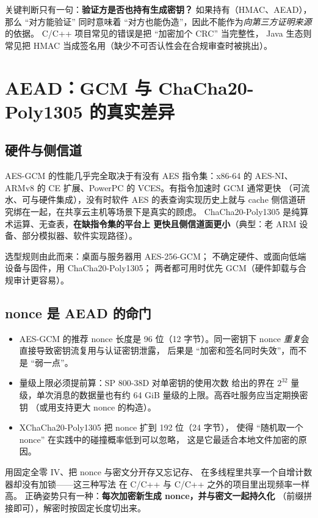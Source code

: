 \documentclass[12pt,a4paper,fontset=fandol]{ctexbook}
\newcommand{\CppJava}{C/C++}
\begin{document}
关键判断只有一句：\textbf{验证方是否也持有生成密钥？}
如果持有（HMAC、AEAD），那么 ``对方能验证'' 同时意味着
``对方也能伪造''，因此不能作为\emph{向第三方证明来源}的依据。
\CppJava{} 项目常见的错误是把 ``加密加个 CRC'' 当完整性，
Java 生态则常见把 HMAC 当成签名用（缺少不可否认性会在合规审查时被挑出）。

\section{AEAD：GCM 与 ChaCha20-Poly1305 的真实差异}

\subsection{硬件与侧信道}

AES-GCM 的性能几乎完全取决于有没有 AES 指令集：x86-64 的 AES-NI、
ARMv8 的 CE 扩展、PowerPC 的 VCES。有指令加速时 GCM 通常更快
（可流水、可与硬件集成），没有时软件 AES 的表查询实现历史上就与
cache 侧信道研究绑在一起，在共享云主机等场景下是真实的顾虑。
ChaCha20-Poly1305 是纯算术运算、无查表，\textbf{在缺指令集的平台上
更快且侧信道面更小}（典型：老 ARM 设备、部分模拟器、软件实现路径）。

选型规则由此而来：桌面与服务器用 AES-256-GCM；
不确定硬件、或面向低端设备与固件，用 ChaCha20-Poly1305；
两者都可用时优先 GCM（硬件卸载与合规审计更容易）。

\subsection{nonce 是 AEAD 的命门}

\begin{itemize}
  \item AES-GCM 的推荐 nonce 长度是 96 位（12 字节）。同一密钥下
        nonce \emph{重复}会直接导致密钥流复用与认证密钥泄露，
        后果是 ``加密和签名同时失效''，而不是 ``弱一点''。
  \item 量级上限必须提前算：SP 800-38D 对单密钥的使用次数
        给出的界在 $2^{32}$ 量级，单次消息的数据量也有约
        64 GiB 量级的上限。高吞吐服务应当定期换密钥
        （或用支持更大 nonce 的构造）。
  \item XChaCha20-Poly1305 把 nonce 扩到 192 位（24 字节），
        使得 ``随机取一个 nonce'' 在实践中的碰撞概率低到可以忽略，
        这是它最适合本地文件加密的原因。
\end{itemize}

\begin{warning}[title=计数器、全零与 ``这条数据只加密一次'' ]
用固定全零 IV、把 nonce 与密文分开存又忘记存、
在多线程里共享一个自增计数器却没有加锁——这三种写法
在 \CppJava{} 与 \CppJava{} 之外的项目里出现频率一样高。
正确姿势只有一种：\textbf{每次加密新生成 nonce，并与密文一起持久化}
（前缀拼接即可），解密时按固定长度切出来。
\end{warning}
\end{document}
